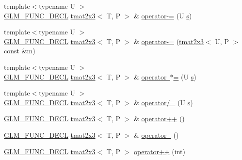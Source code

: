\begin{DoxyCompactItemize}
\item 
{\footnotesize template$<$typename U $>$ }\\\mbox{\hyperlink{setup_8hpp_ab2d052de21a70539923e9bcbf6e83a51}{G\+L\+M\+\_\+\+F\+U\+N\+C\+\_\+\+D\+E\+CL}} \mbox{\hyperlink{structglm_1_1tmat2x3}{tmat2x3}}$<$ T, P $>$ \& \mbox{\hyperlink{structglm_1_1tmat2x3_a2e62101b40eddd5795cd3c9f94315d43}{operator-\/=}} (U \mbox{\hyperlink{glad_8h_af1b1d5edfea6a34daee7389b1b5810ad}{s}})
\item 
{\footnotesize template$<$typename U $>$ }\\\mbox{\hyperlink{setup_8hpp_ab2d052de21a70539923e9bcbf6e83a51}{G\+L\+M\+\_\+\+F\+U\+N\+C\+\_\+\+D\+E\+CL}} \mbox{\hyperlink{structglm_1_1tmat2x3}{tmat2x3}}$<$ T, P $>$ \& \mbox{\hyperlink{structglm_1_1tmat2x3_a7d1c13018b5d2ad3fd2a13fcf03930d1}{operator-\/=}} (\mbox{\hyperlink{structglm_1_1tmat2x3}{tmat2x3}}$<$ U, P $>$ const \&m)
\item 
{\footnotesize template$<$typename U $>$ }\\\mbox{\hyperlink{setup_8hpp_ab2d052de21a70539923e9bcbf6e83a51}{G\+L\+M\+\_\+\+F\+U\+N\+C\+\_\+\+D\+E\+CL}} \mbox{\hyperlink{structglm_1_1tmat2x3}{tmat2x3}}$<$ T, P $>$ \& \mbox{\hyperlink{structglm_1_1tmat2x3_a352304e135050dee13b66c9b406fbfd4}{operator $\ast$=}} (U \mbox{\hyperlink{glad_8h_af1b1d5edfea6a34daee7389b1b5810ad}{s}})
\item 
{\footnotesize template$<$typename U $>$ }\\\mbox{\hyperlink{setup_8hpp_ab2d052de21a70539923e9bcbf6e83a51}{G\+L\+M\+\_\+\+F\+U\+N\+C\+\_\+\+D\+E\+CL}} \mbox{\hyperlink{structglm_1_1tmat2x3}{tmat2x3}}$<$ T, P $>$ \& \mbox{\hyperlink{structglm_1_1tmat2x3_a38e2ae75159a10a3d8883771a3329b29}{operator/=}} (U \mbox{\hyperlink{glad_8h_af1b1d5edfea6a34daee7389b1b5810ad}{s}})
\item 
\mbox{\hyperlink{setup_8hpp_ab2d052de21a70539923e9bcbf6e83a51}{G\+L\+M\+\_\+\+F\+U\+N\+C\+\_\+\+D\+E\+CL}} \mbox{\hyperlink{structglm_1_1tmat2x3}{tmat2x3}}$<$ T, P $>$ \& \mbox{\hyperlink{structglm_1_1tmat2x3_a13841004a80585a9af1e91ed4413b678}{operator++}} ()
\item 
\mbox{\hyperlink{setup_8hpp_ab2d052de21a70539923e9bcbf6e83a51}{G\+L\+M\+\_\+\+F\+U\+N\+C\+\_\+\+D\+E\+CL}} \mbox{\hyperlink{structglm_1_1tmat2x3}{tmat2x3}}$<$ T, P $>$ \& \mbox{\hyperlink{structglm_1_1tmat2x3_a5d7a0f908e4ac53b0caad27168cf9d12}{operator-\/-\/}} ()
\item 
\mbox{\hyperlink{setup_8hpp_ab2d052de21a70539923e9bcbf6e83a51}{G\+L\+M\+\_\+\+F\+U\+N\+C\+\_\+\+D\+E\+CL}} \mbox{\hyperlink{structglm_1_1tmat2x3}{tmat2x3}}$<$ T, P $>$ \mbox{\hyperlink{structglm_1_1tmat2x3_aadd0bc2be76fb70f799aa6988aa2f5a6}{operator++}} (int)

\end{DoxyCompactItemize}

